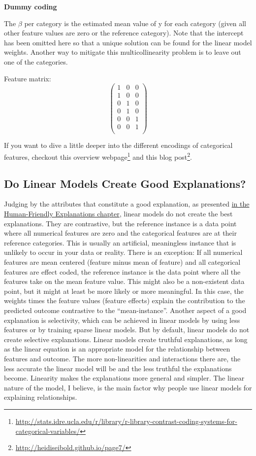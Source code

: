 \documentclass[12pt,]{krantz}
\renewcommand{\href}[2]{#2\footnote{\url{#1}}}
\begin{document}
\textbf{Dummy coding}

The \(\beta\) per category is the estimated mean value of y for each
category (given all other feature values are zero or the reference
category). Note that the intercept has been omitted here so that a
unique solution can be found for the linear model weights. Another way
to mitigate this multicollinearity problem is to leave out one of the
categories.

Feature matrix:
\[\begin{pmatrix}1&0&0\\1&0&0\\0&1&0\\0&1&0\\0&0&1\\0&0&1\\\end{pmatrix}\]

If you want to dive a little deeper into the different encodings of
categorical features, checkout
\href{http://stats.idre.ucla.edu/r/library/r-library-contrast-coding-systems-for-categorical-variables/}{this
overview webpage} and \href{http://heidiseibold.github.io/page7/}{this
blog post}.

\subsection{Do Linear Models Create Good
Explanations?}\label{do-linear-models-create-good-explanations}

Judging by the attributes that constitute a good explanation, as
presented \protect\hyperlink{good-explanation}{in the Human-Friendly
Explanations chapter}, linear models do not create the best
explanations. They are contrastive, but the reference instance is a data
point where all numerical features are zero and the categorical features
are at their reference categories. This is usually an artificial,
meaningless instance that is unlikely to occur in your data or reality.
There is an exception: If all numerical features are mean centered
(feature minus mean of feature) and all categorical features are effect
coded, the reference instance is the data point where all the features
take on the mean feature value. This might also be a non-existent data
point, but it might at least be more likely or more meaningful. In this
case, the weights times the feature values (feature effects) explain the
contribution to the predicted outcome contrastive to the
``mean-instance''. Another aspect of a good explanation is selectivity,
which can be achieved in linear models by using less features or by
training sparse linear models. But by default, linear models do not
create selective explanations. Linear models create truthful
explanations, as long as the linear equation is an appropriate model for
the relationship between features and outcome. The more non-linearities
and interactions there are, the less accurate the linear model will be
and the less truthful the explanations become. Linearity makes the
explanations more general and simpler. The linear nature of the model, I
believe, is the main factor why people use linear models for explaining
relationships.
\end{document}
